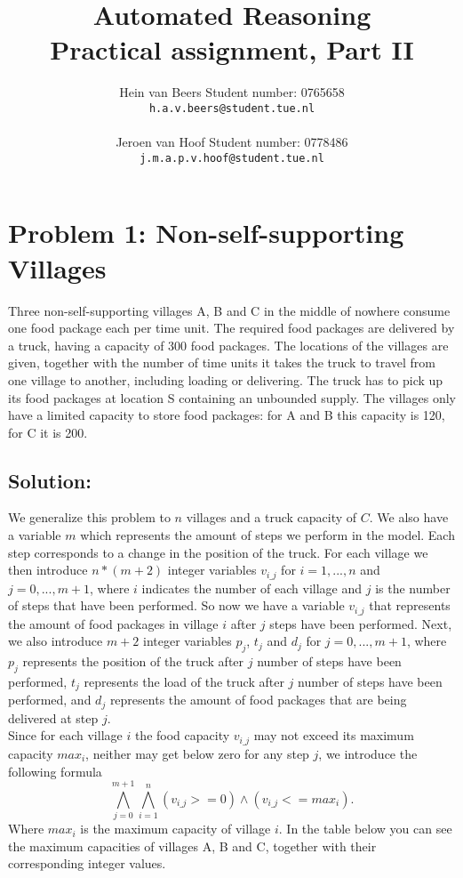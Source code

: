\documentclass[a4paper]{article}
\author{Hein van Beers \qquad Student number: 0765658 \\{\tt h.a.v.beers@student.tue.nl}\\ \\ Jeroen van Hoof \qquad Student number: 0778486 \\{\tt j.m.a.p.v.hoof@student.tue.nl}}
\title{Automated Reasoning\\
	 \large Practical assignment, Part II}
\begin{document}
	\maketitle
	
	\section*{Problem 1: Non-self-supporting Villages}
	Three non-self-supporting villages A, B and C in the middle of nowhere consume one food package each per time unit. The required food packages are delivered by a truck, having a capacity of 300 food packages. The locations of the villages are given, together with the number of time units it takes the truck to travel from one village to another, including loading or delivering. The truck has to pick up its food packages at location S containing an unbounded supply. The villages only have a limited capacity to store food packages: for A and B this capacity is 120, for C it is 200.
	
	\subsection*{Solution:}
	We generalize this problem to $n$ villages and a truck capacity of $C$. We also have a variable $m$ which represents the amount of steps we perform in the model. Each step corresponds to a change in the position of the truck. For each village we then introduce $n * (m+2)$ integer variables $v_{i\_j}$ for $i=1,...,n$ and $j=0,...,m+1$, where $i$ indicates the number of each village and $j$ is the number of steps that have been performed. So now we have a variable $v_{i\_j}$ that represents the amount of food packages in village $i$ after $j$ steps have been performed. Next, we also introduce $m+2$ integer variables $p_j$, $t_j$ and $d_j$ for $j=0,...,m+1$, where $p_j$ represents the position of the truck after $j$ number of steps have been performed, $t_j$ represents the load of the truck after $j$ number of steps have been performed, and $d_j$ represents the amount of food packages that are being delivered at step $j$.\\
	
	Since for each village $i$ the food capacity $v_{i\_j}$ may not exceed its maximum capacity $max_i$, neither may get below zero for any step $j$, we introduce the following formula
\[ \bigwedge_{j=0}^{m+1} \bigwedge_{i=1}^n (v_{i\_j} >= 0) \wedge (v_{i\_j} <= max_i).\]
Where $max_i$ is the maximum capacity of village $i$. In the table below you can see the maximum capacities of villages A, B and C, together with their corresponding integer values.
\end{document}
